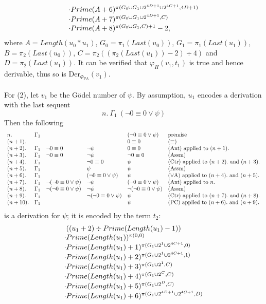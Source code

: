 \documentclass[leqno]{report}
\newcommand{\assm}{{(\mathrm{Assm})}}
\newcommand{\ant}{{(\mathrm{Ant})}}
\newcommand{\pc}{{(\mathrm{PC})}}
\newcommand{\ctr}{{(\mathrm{Ctr})}}
\newcommand{\ora}{{(\lor\mathrm{A})}}
\newcommand{\eq}{{(\equiv)}}
\newcommand{\pa}{\mathrm{PA}}
\newcommand{\Der}[1]{\mathrm{Der}_{#1}}
\begin{document}
\begin{enumerate}[1.]
\[\begin{array}{l}
\cdot Prime(A + 6)^{\pi (G_0 \cup G_1 \cup 2^{4D + 1} \cup 2^{4C + 1}, 4D + 1)} \cr
\cdot Prime(A + 7)^{\pi (G_0 \cup G_1 \cup 2^{4D + 1}, C)} \cr
\cdot Prime(A + 8)^{\pi (G_0 \cup G_1, C) + 1} - 2,
\end{array}
\]
where $A = Length(u_0 \ast u_1)$, $G_0 = \pi_1 (Last(u_0))$, $G_1 = \pi_1 (Last(u_1))$, $B= \pi_2 (Last(u_0))$, $C = \pi_2 ((\pi_2 (Last(u_1)) - 2) \div 4)$ and $D = \pi_2 (Last(u_1))$.
It can be verified that $\varphi_H (v_1, t_1)$ is true and hence derivable, thus so is $\Der{\Phi_\pa} (v_1)$.\\
\ \\
For (2), let $v_1$ be the G\"{o}del number of $\psi$. By assumption, $u_1$ encodes a derivation with the last sequent
\[
n. \ \Gamma_1 \ (\neg 0 \equiv 0 \lor \psi )
\]
Then the following
\[
\begin{array}{llllll}
n. & \Gamma_1 & \ & \ & (\neg 0 \equiv 0 \lor \psi ) & \mbox{premise} \cr
(n + 1). & \ & \ & \ & 0 \equiv 0 & \mbox{$\eq$} \cr
(n + 2). & \Gamma_1 & \neg 0 \equiv 0 & \neg\psi & 0 \equiv 0 & \mbox{$\ant$ applied to $(n + 1).$} \cr
(n + 3). & \Gamma_1 & \neg 0 \equiv 0 & \neg\psi & \neg 0 \equiv 0 & \mbox{$\assm$} \cr
(n + 4). & \Gamma_1 & \ & \neg 0 \equiv 0 & \psi & \mbox{$\ctr$ applied to $(n + 2).$ and $(n + 3).$} \cr
(n + 5). & \Gamma_1 & \ & \psi & \psi & \mbox{$\assm$} \cr
(n + 6). & \Gamma_1 & \ & (\neg 0 \equiv 0 \lor \psi ) & \psi & \mbox{$\ora$ applied to $(n + 4).$ and $(n + 5).$} \cr
(n + 7). & \Gamma_1 & \neg (\neg 0 \equiv 0 \lor \psi ) & \neg\psi & (\neg 0 \equiv 0 \lor \psi ) & \mbox{$\ant$ applied to $n.$} \cr
(n + 8). & \Gamma_1 & \neg (\neg 0 \equiv 0 \lor \psi ) & \neg\psi & \neg (\neg 0 \equiv 0 \lor \psi ) & \mbox{$\assm$} \cr
(n + 9). & \Gamma_1 & \ & \neg (\neg 0 \equiv 0 \lor \psi ) & \psi & \mbox{$\ctr$ applied to $(n + 7).$ and $(n + 8).$} \cr
(n + 10). & \Gamma_1 & \ & \ & \psi & \mbox{$\pc$ applied to $(n + 6).$ and $(n + 9).$}
\end{array}
\]
is a derivation for $\psi$; it is encoded by the term $t_2$:
\[
\begin{array}{l}
\phantom{\cdot} ((u_1 + 2) \div Prime(Length(u_1) - 1))\cr
\cdot Prime(Length(u_1))^{\pi (0, 0)}\cr
\cdot Prime(Length(u_1) + 1)^{\pi (G_1 \cup 2^1 \cup 2^{4C + 1}, 0)}\cr
\cdot Prime(Length(u_1) + 2)^{\pi (G_1 \cup 2^1 \cup 2^{4C + 1}, 1)}\cr
\cdot Prime(Length(u_1) + 3)^{\pi (G_1 \cup 2^1, C)}\cr
\cdot Prime(Length(u_1) + 4)^{\pi (G_1 \cup 2^C, C)}\cr
\cdot Prime(Length(u_1) + 5)^{\pi (G_1 \cup 2^D, C)}\cr
\cdot Prime(Length(u_1) + 6)^{\pi (G_1 \cup 2^{4D + 1} \cup 2^{4C + 1}, D)}\cr

\end{array}\]
\end{enumerate}
\end{document}

